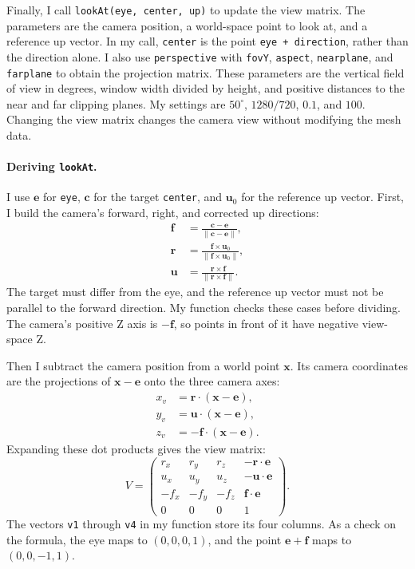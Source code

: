 \documentclass[acmtog]{acmart}
\begin{document}
Finally, I call \texttt{lookAt(eye, center, up)} to update the view matrix. The parameters are the camera position, a world-space point to look at, and a reference up vector. In my call, \texttt{center} is the point \texttt{eye + direction}, rather than the direction alone. I also use \texttt{perspective} with \texttt{fovY}, \texttt{aspect}, \texttt{nearplane}, and \texttt{farplane} to obtain the projection matrix. These parameters are the vertical field of view in degrees, window width divided by height, and positive distances to the near and far clipping planes. My settings are $50^\circ$, $1280/720$, $0.1$, and $100$. Changing the view matrix changes the camera view without modifying the mesh data.

\paragraph{Deriving \texttt{lookAt}.}
I use $\mathbf e$ for \texttt{eye}, $\mathbf c$ for the target \texttt{center}, and $\mathbf u_0$ for the reference up vector. First, I build the camera's forward, right, and corrected up directions:
\begin{equation}
\begin{aligned}
\mathbf f&=\frac{\mathbf c-\mathbf e}{\|\mathbf c-\mathbf e\|},\\
\mathbf r&=\frac{\mathbf f\times\mathbf u_0}{\|\mathbf f\times\mathbf u_0\|},\\
\mathbf u&=\frac{\mathbf r\times\mathbf f}{\|\mathbf r\times\mathbf f\|}.
\end{aligned}
\end{equation}
The target must differ from the eye, and the reference up vector must not be parallel to the forward direction. My function checks these cases before dividing. The camera's positive Z axis is $-\mathbf f$, so points in front of it have negative view-space Z.

Then I subtract the camera position from a world point $\mathbf x$. Its camera coordinates are the projections of $\mathbf x-\mathbf e$ onto the three camera axes:
\begin{equation}
\begin{aligned}
x_v&=\mathbf r\cdot(\mathbf x-\mathbf e),\\
y_v&=\mathbf u\cdot(\mathbf x-\mathbf e),\\
z_v&=-\mathbf f\cdot(\mathbf x-\mathbf e).
\end{aligned}
\end{equation}
Expanding these dot products gives the view matrix:
\begin{equation}
V=
\begin{pmatrix}
r_x&r_y&r_z&-\mathbf r\cdot\mathbf e\\
u_x&u_y&u_z&-\mathbf u\cdot\mathbf e\\
-f_x&-f_y&-f_z&\mathbf f\cdot\mathbf e\\
0&0&0&1
\end{pmatrix}.
\end{equation}
The vectors \texttt{v1} through \texttt{v4} in my function store its four columns. As a check on the formula, the eye maps to $(0,0,0,1)$, and the point $\mathbf e+\mathbf f$ maps to $(0,0,-1,1)$.
\end{document}
